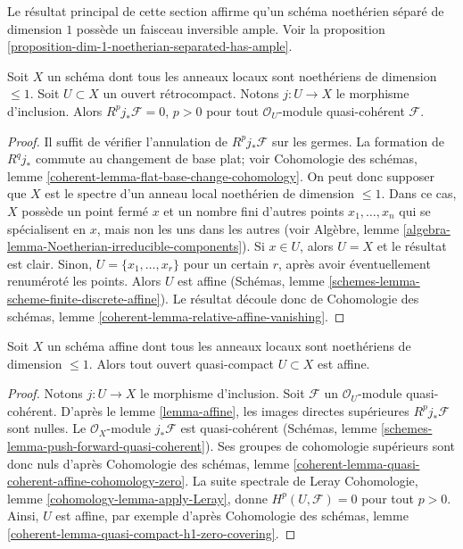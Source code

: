 \noindent
Le résultat principal de cette section affirme qu'un
schéma noethérien séparé de dimension $1$ possède un
faisceau inversible ample. Voir la
proposition \ref{proposition-dim-1-noetherian-separated-has-ample}.

\begin{lemma}
\label{lemma-affine}
Soit $X$ un schéma dont tous les anneaux locaux sont noethériens de dimension
$\leq 1$. Soit $U \subset X$ un ouvert rétrocompact. Notons
$j : U \to X$ le morphisme d'inclusion. Alors $R^pj_*\mathcal{F} = 0$, $p > 0$
pour tout $\mathcal{O}_U$-module quasi-cohérent $\mathcal{F}$.
\end{lemma}

\begin{proof}
Il suffit de vérifier l'annulation de $R^pj_*\mathcal{F}$ sur les germes.
La formation de $R^qj_*$ commute au changement de base plat; voir
Cohomologie des schémas, lemme
\ref{coherent-lemma-flat-base-change-cohomology}.
On peut donc supposer que $X$ est le spectre d'un anneau local noethérien
de dimension $\leq 1$. Dans ce cas, $X$ possède un point fermé
$x$ et un nombre fini d'autres points $x_1, \ldots, x_n$ qui se spécialisent
en $x$, mais non les uns dans les autres (voir
Algèbre, lemme \ref{algebra-lemma-Noetherian-irreducible-components}).
Si $x \in U$, alors $U = X$ et le résultat est clair. Sinon,
$U = \{x_1, \ldots, x_r\}$ pour un certain $r$, après avoir éventuellement renuméroté
les points. Alors $U$ est affine
(Schémas, lemme \ref{schemes-lemma-scheme-finite-discrete-affine}).
Le résultat découle donc de Cohomologie des schémas, lemme
\ref{coherent-lemma-relative-affine-vanishing}.
\end{proof}

\begin{lemma}
\label{lemma-open-in-affine-curve-affine}
Soit $X$ un schéma affine dont tous les anneaux locaux sont noethériens
de dimension $\leq 1$. Alors tout ouvert quasi-compact $U \subset X$ est affine.
\end{lemma}

\begin{proof}
Notons $j : U \to X$ le morphisme d'inclusion. Soit $\mathcal{F}$
un $\mathcal{O}_U$-module quasi-cohérent.
D'après le lemme \ref{lemma-affine}, les images directes supérieures
$R^pj_*\mathcal{F}$ sont nulles. Le $\mathcal{O}_X$-module $j_*\mathcal{F}$
est quasi-cohérent
(Schémas, lemme \ref{schemes-lemma-push-forward-quasi-coherent}).
Ses groupes de cohomologie supérieurs sont donc nuls d'après
Cohomologie des schémas, lemme
\ref{coherent-lemma-quasi-coherent-affine-cohomology-zero}.
La suite spectrale de Leray
Cohomologie, lemme \ref{cohomology-lemma-apply-Leray},
donne $H^p(U, \mathcal{F}) = 0$ pour tout $p > 0$.
Ainsi, $U$ est affine, par exemple d'après
Cohomologie des schémas, lemme
\ref{coherent-lemma-quasi-compact-h1-zero-covering}.
\end{proof}

